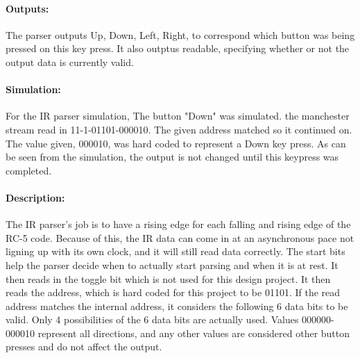 \documentclass[]{article}
\begin{document}
\paragraph{Outputs:} The parser outputs Up, Down, Left, Right, to correspond which button was being pressed on this key press. It also outptus readable, specifying whether or not the output data is currently valid.
\paragraph{Simulation:} For the IR parser simulation, The button "Down" was simulated. the manchester stream read in 11-1-01101-000010. The given address matched so it continued on. The value given, 000010, was hard coded to represent a Down key press. As can be seen from the simulation, the output is not changed until this keypress was completed.
\paragraph{Description:} The IR parser's job is to have a rising edge for each falling and rising edge of the RC-5 code. Because of this, the IR data can come in at an asynchronous pace not ligning up with its own clock, and it will still read data correctly. 
The start bits help the parser decide when to actually start parsing and when it is at rest. It then reads in the toggle bit which is not used for this design project. It then reads the address, which is  hard coded for this project to be 01101. If the read address matches the internal address, it considers the following 6 data bits to be valid.
Only 4 possibilities of the 6 data bits are actually used. Values 000000-000010 represent all directions, and any other values are considered other button presses and do not affect the output.
\end{document}
